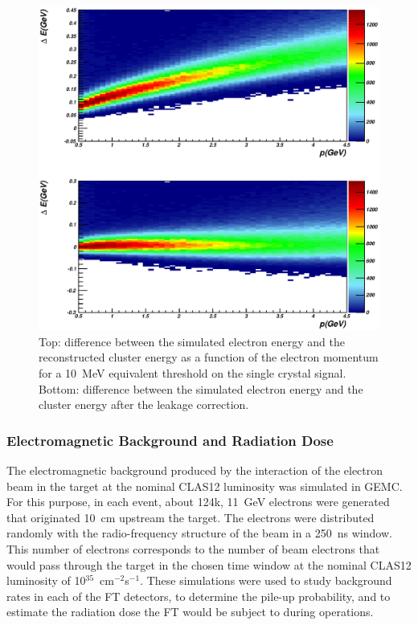 \begin{figure}
\includegraphics[height=\columnwidth]{fig/gemc_leakage.eps}
\caption{Top: difference between the simulated electron energy and the reconstructed cluster energy as a function
  of the electron momentum for a 10~MeV equivalent threshold on the single crystal signal. Bottom: difference between
  the simulated electron energy and the cluster energy after the leakage correction.}
\label{fig:gemc_leakage}
\end{figure}

\subsubsection{Electromagnetic Background and Radiation Dose}

The electromagnetic background produced by the interaction of the electron beam in the target  at the nominal
CLAS12 luminosity was simulated in GEMC. For this purpose, in each event, about 124k, 11~GeV electrons were
generated that originated 10~cm upstream the target. The electrons were distributed randomly with the
radio-frequency structure of the beam in a 250~ns window. This number of electrons corresponds to the number
of beam electrons that would pass through the target in the chosen time window at the nominal CLAS12 luminosity
of 10$^{35}$~cm$^{-2}$s$^{-1}$. These simulations were used to study background rates in each of the FT detectors,
to determine the pile-up probability, and to estimate the radiation dose the FT would be subject to during operations.

